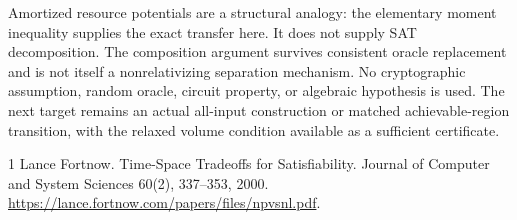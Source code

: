 \documentclass[11pt]{article}
\begin{document}
Amortized resource potentials are a structural analogy: the elementary
moment inequality supplies the exact transfer here. It does not supply
SAT decomposition. The composition argument survives consistent oracle
replacement and is not itself a nonrelativizing separation mechanism.
No cryptographic assumption, random oracle, circuit property, or
algebraic hypothesis is used. The next target remains an actual
all-input construction or matched achievable-region transition, with
the relaxed volume condition available as a sufficient certificate.

\begin{thebibliography}{1}
 Lance Fortnow. Time-Space Tradeoffs for Satisfiability.
Journal of Computer and System Sciences 60(2), 337--353, 2000.
\url{https://lance.fortnow.com/papers/files/npvsnl.pdf}.
\end{thebibliography}
\end{document}

